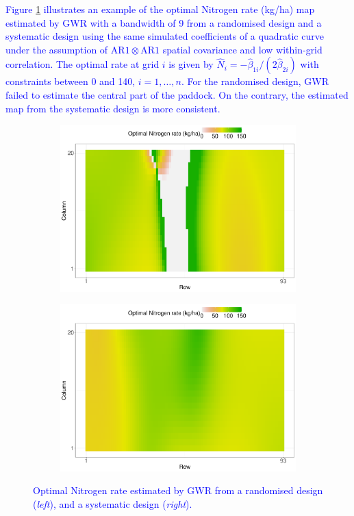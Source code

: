 \documentclass[a4paper]{article} 	%
\newcommand{\AR}{\mathrm{AR1}}
\newcommand{\zc}[1]{\textcolor{blue}{#1}}
\begin{document}
\zc{Figure \ref{fig:optNmap} illustrates an example of the optimal Nitrogen rate (kg/ha) map estimated by GWR with a bandwidth of 9 from a randomised design and a systematic design using the same simulated coefficients of a quadratic curve under the assumption of $\AR\otimes\AR$ spatial covariance and low within-grid correlation. The optimal rate at grid $i$ is given by $\hat{N}_i = -\hat{\beta}_{1i}/(2\hat{\beta}_{2i})$ with constraints between 0 and 140, $i=1,\ldots,n$. For the randomised design, GWR failed to estimate the central part of the paddock. On the contrary, the estimated map from the systematic design is more consistent.}

\begin{figure}[H]
	\begin{subfigure}[t]{0.45\textwidth}
		\centering
		\includegraphics[width=\linewidth]{Expt/optN_syst_AR1B9.pdf}
        \end{subfigure}
	\hspace{0.05\textwidth}
	\begin{subfigure}[t]{0.45\textwidth}
		\centering
		\includegraphics[width=\linewidth]{Expt/optN_rand_AR1B9.pdf}
        \end{subfigure}
	\caption{\zc{Optimal Nitrogen rate estimated by GWR from a randomised design (\textit{left}), and a systematic design (\textit{right}).}}\label{fig:optNmap}
\end{figure}
\end{document}
